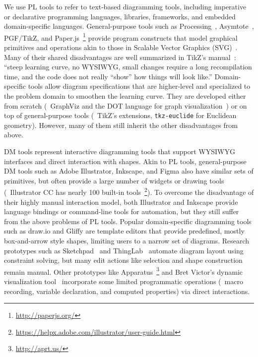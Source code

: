 We use PL tools to refer to text-based diagramming tools, including imperative or declarative programming languages, libraries, frameworks, and embedded domain-specific languages. General-purpose tools such as Processing~\cite{Reas:2006:PPM}, Asymtote~\cite{Bowman:2008:AVG}, PGF/TikZ, and Paper.js~\footnote{\url{http://paperjs.org/}} provide program constructs that model graphical primitives and operations akin to those in Scalable Vector Graphics (SVG)~\cite{SVGStandard}. Many of their shared disadvantages are well summarized in TikZ's manual~\cite{TikZ-Manual}: ``steep learning curve, no WYSIWYG, small changes require a long recompilation time, and the code does not really ``show'' how things will look like.'' Domain-specific tools allow diagram specifications that are higher-level and specialized to the problem domain to smoothen the learning curve. They are developed either from scratch (\eg~GraphViz and the DOT language for graph visualization~\cite{Graphviz}) or on top of general-purpose tools (\eg~TikZ's extensions, \texttt{tkz-euclide} for Euclidean geometry). However, many of them still inherit the other disadvantages from above. 

DM tools represent interactive diagramming tools that support WYSIWYG interfaces and direct interaction with shapes. Akin to PL tools, general-purpose DM tools such as Adobe Illustrator, Inkscape, and Figma also have similar sets of primitives, but often provide a large number of widgets or drawing tools (\eg~Illustrator CC has nearly 100 built-in tools~\footnote{\url{https://helpx.adobe.com/illustrator/user-guide.html}}). To overcome the disadvantage of their highly manual interaction model, both Illustrator and Inkscape provide language bindings or command-line tools for automation, but they still suffer from the above problems of PL tools. Popular domain-specific diagramming tools such as draw.io and Gliffy are template editors that provide predefined, mostly box-and-arrow style shapes, limiting users to a narrow set of diagrams. Research prototypes such as Sketchpad~\cite{sketchpad} and ThingLab~\cite{thinglab} automate diagram layout using constraint solving, but many edit actions like selection and shape construction remain manual. Other prototypes like Apparatus~\footnote{\url{http://aprt.us/}} and Bret Victor's dynamic visualization tool~\cite{dynamicViz} incorporate some limited programmatic operations (\eg~macro recording, variable declaration, and computed properties) via direct interactions. 

